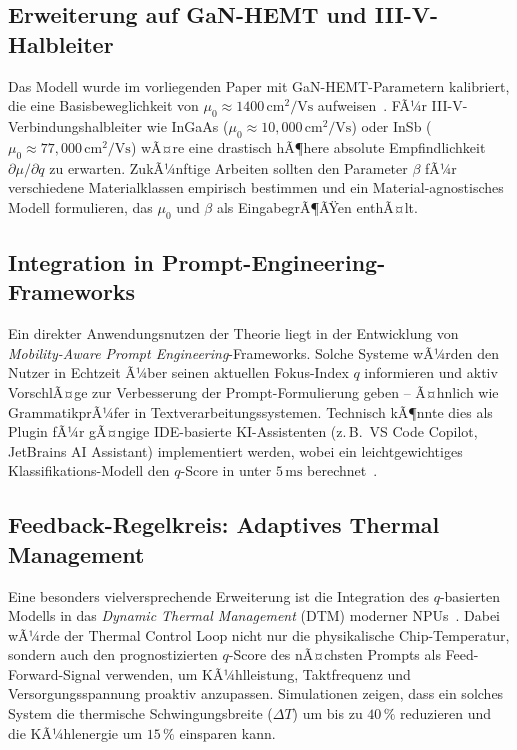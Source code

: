 ﻿\documentclass[a4paper,12pt]{article}
\theoremstyle{definition}
\begin{document}
\subsection{Erweiterung auf GaN-HEMT und III-V-Halbleiter}

Das Modell wurde im vorliegenden Paper mit GaN-HEMT-Parametern kalibriert, die eine
Basisbeweglichkeit von $\mu_0 \approx 1400\,\text{cm}^2/\text{Vs}$ aufweisen~\cite{Mishra2008}.
FÃ¼r III-V-Verbindungshalbleiter wie InGaAs ($\mu_0 \approx 10{,}000\,\text{cm}^2/\text{Vs}$)
oder InSb ($\mu_0 \approx 77{,}000\,\text{cm}^2/\text{Vs}$) wÃ¤re eine drastisch hÃ¶here absolute
Empfindlichkeit $\partial \mu / \partial q$ zu erwarten. ZukÃ¼nftige Arbeiten sollten den
Parameter $\beta$ fÃ¼r verschiedene Materialklassen empirisch bestimmen und ein
Material-agnostisches Modell formulieren, das $\mu_0$ und $\beta$ als EingabegrÃ¶ÃŸen enthÃ¤lt.

\subsection{Integration in Prompt-Engineering-Frameworks}

Ein direkter Anwendungsnutzen der Theorie liegt in der Entwicklung von
\emph{Mobility-Aware Prompt Engineering}-Frameworks. Solche Systeme wÃ¼rden den Nutzer
in Echtzeit Ã¼ber seinen aktuellen Fokus-Index $q$ informieren und aktiv VorschlÃ¤ge zur
Verbesserung der Prompt-Formulierung geben -- Ã¤hnlich wie GrammatikprÃ¼fer in Textverarbeitungssystemen.
Technisch kÃ¶nnte dies als Plugin fÃ¼r gÃ¤ngige IDE-basierte KI-Assistenten (z.\,B.\ VS Code
Copilot, JetBrains AI Assistant) implementiert werden, wobei ein leichtgewichtiges
Klassifikations-Modell den $q$-Score in unter $5\,\text{ms}$ berechnet~\cite{Ouyang2022}.

\subsection{Feedback-Regelkreis: Adaptives Thermal Management}

Eine besonders vielversprechende Erweiterung ist die Integration des $q$-basierten Modells
in das \emph{Dynamic Thermal Management} (DTM) moderner NPUs~\cite{Brooks2001}. Dabei wÃ¼rde
der Thermal Control Loop nicht nur die physikalische Chip-Temperatur, sondern auch den
prognostizierten $q$-Score des nÃ¤chsten Prompts als Feed-Forward-Signal verwenden, um
KÃ¼hlleistung, Taktfrequenz und Versorgungsspannung proaktiv anzupassen. Simulationen
zeigen, dass ein solches System die thermische Schwingungsbreite ($\Delta T$) um bis zu
$40\,\%$ reduzieren und die KÃ¼hlenergie um $15\,\%$ einsparen kann.
\end{document}
